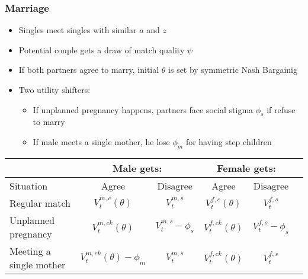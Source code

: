 \documentclass[aspectratio=169]{beamer}
\let\olditem\item
\renewcommand{\item}{%
\olditem\vspace{\fill}}
\begin{document}
\begin{frame}
\frametitle{Marriage}
\begin{itemize}
\item Singles meet singles with similar $a$ and $z$ 
\item Potential couple gets a draw of match quality $\psi$
\item If both partners agree to marry, initial $\theta$ is set by symmetric Nash Bargainig
\item Two utility shifters:
\begin{itemize}
\item If unplanned pregnancy happens, partners face social stigma $\phi_s$ if refuse to marry
\item If male meets a single mother, he lose $\phi_m$ for having step children
\end{itemize}
\end{itemize}
\begin{center}
{\footnotesize
\begin{tabular}{|l||c|c||c|c||c|}\hline
 & \multicolumn{2}{|c||}{Male gets:} & \multicolumn{2}{|c||}{Female gets:} \\\hline
Situation & Agree & Disagree & Agree & Disagree \\\hline
Regular match & $V^{m,c}_t(\theta)$ & $V^{m,s}_t$ & $V^{f,c}_t(\theta)$ & $V^{f,s}_t$ \\
Unplanned pregnancy & $V^{m,ck}_t(\theta)$ & $V^{m,s}_t - \phi_s$ & $V^{f,ck}_t(\theta)$ & $V^{f,s}_t - \phi_s$ \\
Meeting a single mother & $V^{m,ck}_t(\theta) - \phi_m$ & $V^{m,s}_t$ & $V^{f,ck}_t(\theta)$ & $V^{f,s}_t$ \\\hline
\end{tabular}
}
\end{center}
\end{frame}
\end{document}
